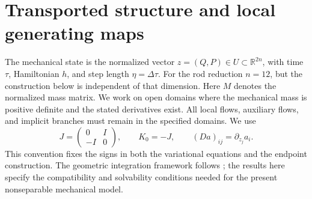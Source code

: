 \section{Transported structure and local generating maps}
\label{sec:theory}

The mechanical state is the normalized vector $z=(Q,P)\in U\subset\mathbb R^{2n}$, with time $\tau$, Hamiltonian $h$, and step length $\eta=\Delta\tau$. For the rod reduction $n=12$, but the construction below is independent of that dimension. Here $M$ denotes the normalized mass matrix. We work on open domains where the mechanical mass is positive definite and the stated derivatives exist. All local flows, auxiliary flows, and implicit branches must remain in the specified domains. We use
\begin{equation}
 J=\begin{pmatrix}0&I\\-I&0\end{pmatrix},\qquad K_0=-J,
 \qquad (Da)_{ij}=\partial_{z_j}a_i .
 \label{eq:th-conventions}
\end{equation}
This convention fixes the signs in both the variational equations and the endpoint construction. The geometric integration framework follows \citet{FengQin2010,Hairer2006}; the results here specify the compatibility and solvability conditions needed for the present nonseparable mechanical model.

